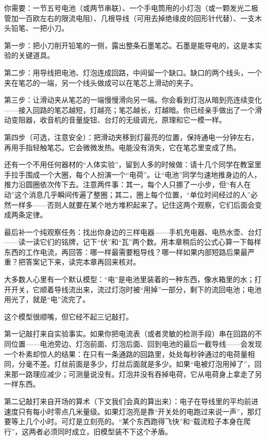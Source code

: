 \begin{experiment}[铅笔芯变阻器]
你需要：一节五号电池（或两节串联）、一个手电筒用的小灯泡（或一颗发光二极管加一百欧左右的限流电阻）、几根导线（可用去掉绝缘皮的回形针代替）、一支木头铅笔、一把小刀。

第一步：把小刀削开铅笔的一侧，露出整条石墨笔芯。石墨是能导电的，这是本实验的关键道具。

第二步：用导线把电池、灯泡连成回路，中间留一个缺口。缺口的两个线头，一个夹在笔芯的一端，另一个线头做成可以在笔芯上滑动的夹子。

第三步：让滑动夹从笔芯的一端慢慢滑向另一端。你会看到灯泡从暗到亮连续变化——接入回路的笔芯越短，灯越亮；笔芯越长，灯越暗。你已经亲手做出了一个滑动变阻器，收音机的音量旋钮、台灯的无级调光，原理和它一模一样。

第四步（可选，注意安全）：把滑动夹移到灯最亮的位置，保持通电一分钟左右，再用手指轻触笔芯。它会微微发热。电能没有消失，它在笔芯里变成了热。
\end{experiment}

还有一个不用任何器材的“人体实验”，留到人多的时候做：请十几个同学在教室里手拉手围成一个大圈，每个人扮演一个“电荷”。让“电池”同学匀速地推身边的人，推力沿圆圈依次传下去。注意两件事：其一，每个人只挪了一小步，但“有人在动”这个消息几乎瞬间传遍了整圈；其二，圈上每个位置，“单位时间经过的人”必然一样多——否则人就要在某个地方堆积起来了。记住这两个观察，它们后面会变成两条定律。

最后补一个纯观察任务：找出你身边的三样电器——手机充电器、电热水壶、台灯——读一读它们的铭牌，记下“伏”和“瓦”两个数。用本章稍后的公式心算一下每样东西的工作电流，再回答：哪一样最需要粗导线？哪一样如果内部短路后果最严重？把答案记下来，读完本章再回来核对。


大多数人心里有一个默认模型：“电”是电池里装着的一种东西，像水箱里的水；打开开关，它顺着导线流出来，流过灯泡时被“用掉”一部分，剩下的流回电池；电池用光了，就是“电”流完了。

这个模型很顺嘴，但它经不起三记敲打。

第一记敲打来自实验事实。如果你把电流表（或者灵敏的检测手段）串在回路的不同位置——电池旁边、灯泡前面、灯泡后面、回到电池的最后一截导线——会发现一个朴素却惊人的结果：在只有一条通路的回路里，处处每秒钟通过的电荷量相同，分毫不差。灯丝前面是多少，灯丝后面就是多少。如果“电被灯泡用掉了”，回来那一路理应减少；可测量说没有。灯泡并没有吞掉电荷，它从电荷身上拿走了另一样东西。

第二记敲打来自开场的算术（下文我们会真的算出来）：电子在导线里的平均前进速度只有每小时零点几米量级。如果灯泡亮是靠“开关处的电跑过来说一声”，那灯要等上几个小时。可灯是立刻亮的。“某个东西跑得飞快”和“载流粒子本身在爬行”，这两者必须同时成立，旧模型装不下这个矛盾。

